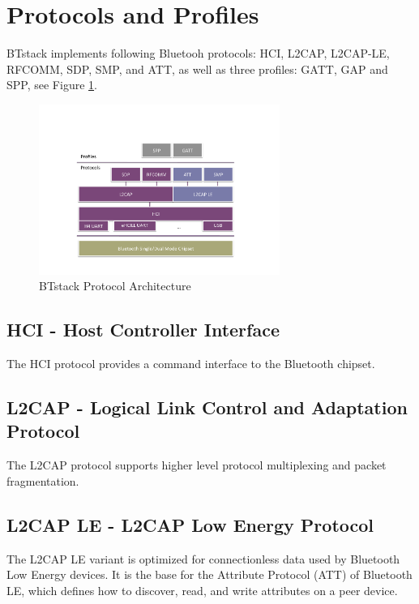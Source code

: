 \section{Protocols and Profiles}
\label{section:protocols_profiles}

BTstack implements following Bluetooh protocols: HCI, L2CAP, L2CAP-LE, RFCOMM, SDP, SMP,  and ATT, as well as three profiles: GATT, GAP and SPP, see Figure \ref{fig:BTstackProtocolArchitecture}. 

\begin{figure}[htbp] %
   \centering
   \includegraphics[width=0.7\textwidth]{picts/btstack-protocols.pdf} 
   \caption{BTstack Protocol Architecture}
   \label{fig:BTstackProtocolArchitecture}
\end{figure}

\subsection{HCI - Host Controller Interface}
The HCI protocol provides a command interface to the Bluetooth chipset. 

\subsection{L2CAP -  Logical Link Control and Adaptation Protocol}
The L2CAP protocol supports higher level protocol multiplexing and packet fragmentation.

\subsection{L2CAP LE - L2CAP Low Energy Protocol}
The L2CAP LE variant is optimized for connectionless data used by Bluetooth Low Energy devices. It is the base for the Attribute Protocol (ATT) of Bluetooth LE, which defines how to discover, read, and write attributes on a peer device. %

